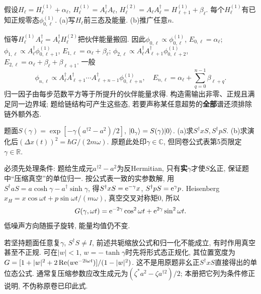 \begin{exercise}
假设$H_\ell=H_\ell^{(1)}+\alpha_\ell$, $H_\ell^{(1)}=A_\ell^\dagger A_\ell$, $H_\ell^{(2)}=A_\ell A_\ell^\dagger=H_{\ell+1}^{(1)}+\beta_\ell$. 每个$H_\ell^{(1)}$有已知正规零态$\phi_{0,\ell}^{(1)}$. (a)写$H_\ell$前三态及能量. (b)推广任意$n$.
\end{exercise}
\begin{solution}
恒等$H_\ell^{(1)}A_\ell^\dagger=A_\ell^\dagger H_\ell^{(2)}$把伙伴能量搬回. 因此$\phi_{0,\ell}\propto\phi_{0,\ell}^{(1)}$, $E_{0,\ell}=\alpha_\ell$; $\phi_{1,\ell}\propto A_\ell^\dagger\phi_{0,\ell+1}^{(1)}$, $E_{1,\ell}=\alpha_\ell+\beta_\ell$; $\phi_{2,\ell}\propto A_\ell^\dagger A_{\ell+1}^\dagger\phi_{0,\ell+2}^{(1)}$, $E_{2,\ell}=\alpha_\ell+\beta_\ell+\beta_{\ell+1}$. 一般
\[
\phi_{n,\ell}\propto A_\ell^\dagger A_{\ell+1}^\dagger\cdots A_{\ell+n-1}^\dagger\phi_{0,\ell+n}^{(1)},\quad
E_{n,\ell}=\alpha_\ell+\sum_{q=0}^{n-1}\beta_{\ell+q}.
\]
归一因子由每步范数平方等于所提升的伙伴能量求得. 构造需输出非零、正规且满足同一边界域; 题给链结构可产生这些态, 若要声称某任意超势的\textbf{全部}谱还须排除链外额外态.
\end{solution}
\begin{exercise}
题面$S(\gamma)=\exp[-\gamma(a^{\dagger2}-a^2)/2]$, $\lvert 0_\gamma\rangle=S(\gamma)\lvert 0\rangle$. (a)求$S^\dagger xS,S^\dagger pS$. (b)求演化后$(\Delta x(t))^2=\hbar G/(2m\omega)$. 原题此处印$\gamma\in\mathbb C$, 但同卷公式表第5页限定$\gamma\in\mathbb R$.
\end{exercise}
\begin{solution}
必须先处理条件: 题给生成元$a^{\dagger2}-a^2$为反Hermitian, 只有\textbf{实}$\gamma$才使$S$幺正, 保证题中“压缩真空”的单位归一. 按公式表一致的实参数解, 用$S^\dagger aS=a\cosh\gamma-a^\dagger\sinh\gamma$, 得$S^\dagger xS=\mathrm e^{-\gamma}x$, $S^\dagger pS=\mathrm e^\gamma p$. Heisenberg$x_H=x\cos\omega t+p\sin\omega t/(m\omega)$, 真空交叉对称矩0, 所以
\[
G(\gamma,\omega t)=\mathrm e^{-2\gamma}\cos^2\omega t+\mathrm e^{2\gamma}\sin^2\omega t.
\]
低噪声方向随振子旋转, 能量均值仍不变.

若坚持题面任意复$\gamma$, $S^\dagger S\neq I$, 前述共轭缩放公式和归一化不能成立, 有时作用真空甚至不正规. 可在$|w|<1$, $w=-\tanh\gamma$时先将形式态正规化, 其位置宽度为$G=[1+|w|^2+2\operatorname{Re}(w\mathrm e^{-2\mathrm i\omega t})]/(1-|w|^2)$. 这不是用原题非幺正$S^\dagger xS$直接得出的单位态公式. 通常复压缩参数应改生成元为$(\zeta^*a^2-\zeta a^{\dagger2})/2$; 本册把它列为条件修正说明, 不伪称原卷已印此式.
\end{solution}
